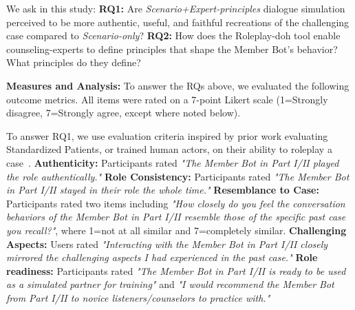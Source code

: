 We ask in this study: 
\textbf{RQ1:} Are \emph{Scenario+Expert-principles} dialogue simulation perceived to be more authentic, useful, and faithful recreations of the challenging case compared to \emph{Scenario-only}? 
\textbf{RQ2:} How does the Roleplay-doh tool enable counseling-experts to define principles that shape the Member Bot's behavior? What principles do they define?   

\textbf{Measures and Analysis:} 
To answer the RQs above, we evaluated the following outcome metrics. All items were rated on a 7-point Likert scale (1=Strongly disagree, 7=Strongly agree, except where noted below).


To answer RQ1, we use evaluation criteria inspired by prior work evaluating Standardized Patients, or trained human actors, on their ability to roleplay a case~\cite{himmelbauer2018standardized}. \textbf{Authenticity:} Participants rated \emph{"The Member Bot in Part I/II played the role authentically."} \textbf{Role Consistency:} Participants rated  \emph{"The Member Bot in Part I/II stayed in their role the whole time."}  \textbf{Resemblance to Case:} Participants rated two items including \emph{"How closely do you feel the conversation behaviors of the Member Bot in Part I/II resemble those of the specific past case you recall?"}, where 1=not at all similar and 7=completely similar. \textbf{Challenging Aspects:} Users rated \emph{"Interacting with the Member Bot in Part I/II closely mirrored the challenging aspects I had experienced in the past case."} \textbf{Role readiness:} Participants rated \emph{"The Member Bot in Part I/II is ready to be used as a simulated partner for training"} and \emph{"I would recommend the Member Bot from Part I/II to novice listeners/counselors to practice with."} 



